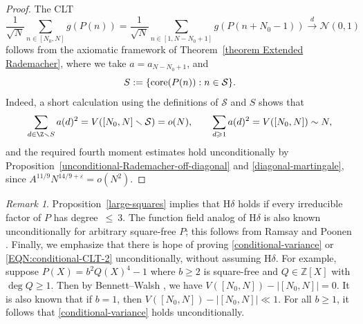 \documentclass[reqno, 12pt]{amsart}
\theoremstyle{plain}
\theoremstyle{definition}
\theoremstyle{remark}
\newtheorem*{remark}{Remark}
\renewcommand{\le}{\leqslant}
\renewcommand{\ge}{\geqslant}
\newcommand{\co}{\textnormal{core}}
\begin{document}
\begin{proof}
The CLT
\begin{equation}
\label{EQN:conditional-CLT-1}
\frac{1}{\sqrt{N}} \sum_{n\in [N_0,N]} g(P(n))
= \frac{1}{\sqrt{N}} \sum_{n\in [1,N-N_0+1]} g(P(n+N_0-1))
\xrightarrow[]{d} \mathcal{N}(0,1)
\end{equation}
follows from
the axiomatic framework of Theorem~\ref{theorem Extended Rademacher},
where we take
$a=a_{N-N_0+1}$, and
$$S := \{\co(P(n)): n\in \mathcal{S}\}.$$
Indeed, a short calculation using the definitions of $\mathcal{S}$ and $S$
shows that
$$\sum_{d\in \Z\smallsetminus S} a(d)^2 = V([N_0,N]\smallsetminus \mathcal{S}) = o(N),
\qquad \sum_{d\ge 1} a(d)^2 = V([N_0,N]) \sim N,$$
and the required fourth moment estimates hold unconditionally by Proposition~\ref{unconditional-Rademacher-off-diagonal}
and \eqref{diagonal-martingale},
since $A^{11/9} N^{14/9+\varepsilon} = o(N^2)$.
\end{proof}


\begin{remark}
Proposition~\ref{large-squares} implies that H$\delta$ holds if
 every irreducible factor of $P$ has degree~$\le~3$.
The function field analog of H$\delta$ is also known unconditionally for arbitrary square-free $P$;
this follows from Ramsay \cite{Ramsay}
and Poonen \cite{Poonen}.
Finally, we emphasize that there is hope of proving \eqref{conditional-variance}
or \eqref{EQN:conditional-CLT-2} unconditionally, without assuming H$\delta$.
For example, suppose $P(X) = b^2 Q(X)^4 - 1$ where $b\ge 2$ is square-free
and $Q\in \mathbb{Z}[X]$ with $\deg{Q}\ge 1$.
Then by
Bennett--Walsh \cite{BennettWalsh},
we have $V([N_0,N]) - |[N_0,N]| = 0$.
It is also known that if $b=1$, then $V([N_0,N]) - |[N_0,N]| \ll 1$.
For all $b\ge 1$, it follows that \eqref{conditional-variance} holds unconditionally.
\end{remark}


\end{document}
